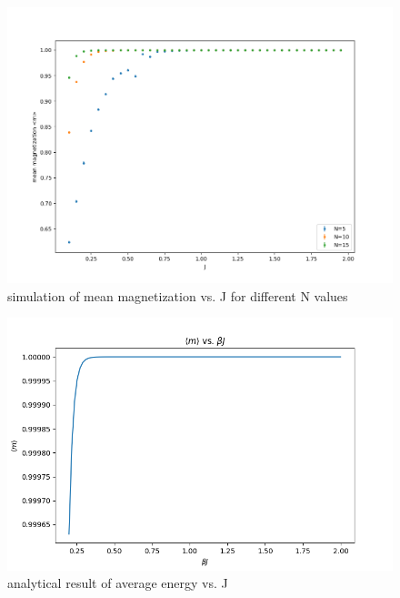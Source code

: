 \documentclass{article}
\begin{document}
\begin{enumerate}
\begin{figure}[htbp]
    \centering
    \includegraphics[width = .8\linewidth]{mag_vs_J.png}
    \caption{simulation of mean magnetization vs. J for different N values}
    \label{fig:mag_J}
\end{figure}
\begin{figure}[htbp]
    \centering
    \includegraphics[width = .8\linewidth]{analytic_mag.png}
    \caption{analytical result of average energy vs. J}
    \label{fig:anal_mag}
\end{figure}


\end{enumerate}
\end{document}
